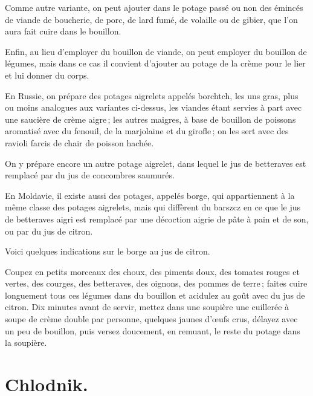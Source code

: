 \sk

Comme autre variante, on peut ajouter dans le potage passé ou non des émincés
de viande de boucherie, de porc, de lard fumé, de volaille ou de gibier, que
l’on aura fait cuire dans le bouillon.

\sk

Enfin, au lieu d'employer du bouillon de viande, on peut employer du bouillon
de légumes, mais dans ce cas il convient d'ajouter au potage de la crème pour
le lier et lui donner du corps.

\sk

En Russie, on prépare des potages aigrelets appelés borchtch, les uns gras,
plus ou moins analogues aux variantes ci-dessus, les viandes étant servies
à part avec une saucière de crème aigre ; les autres maigres, à base de
bouillon de poissons aromatisé avec du fenouil, de la marjolaine et du girofle ;
on les sert avec des ravioli farcis de chair de poisson hachée.

\sk

On y prépare encore un autre potage aigrelet, dans lequel le jus de betteraves
est remplacé par du jus de concombres saumurés.

\sk

En Moldavie, il existe aussi des potages, appelés borge, qui appartiennent à la
même classe des potages aigrelets, mais qui diffèrent du barszcz en ce que le
jus de betteraves aigri est remplacé par une décoction aigrie de pâte à pain et
de son, ou par du jus de citron.

Voici quelques indications sur le borge au jus de citron.

\smallskip

Coupez en petits morceaux des choux, des piments doux, des tomates rouges et
vertes, des courges, des betteraves, des oignons, des pommes de terre ; faites
cuire longuement tous ces légumes dans du bouillon et acidulez au goût avec du
jus de citron. Dix minutes avant de servir, mettez dans une soupière une
cuillerée à soupe de crème double par personne, quelques jaunes d'œufs crus,
délayez avec un peu de bouillon, puis versez doucement, en remuant, le reste du
potage dans la soupière.

\section*{\centering Chlodnik.}

